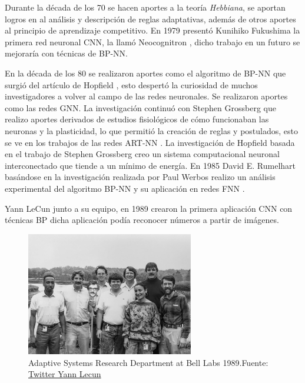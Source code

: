 Durante la década de los 70 se hacen aportes a la teoría \textit{Hebbiana}, se aportan logros en al análisis y descripción de reglas adaptativas, además de otros aportes al principio de aprendizaje competitivo.
En 1979 presentó {Kunihiko Fukushima} la primera red neuronal \gls{CNN}, la llamó Neocognitron \cite{fukushima1979neural}, dicho trabajo en un futuro se mejoraría con técnicas de \gls{BP-NN}.

En la década de los 80 se realizaron aportes como el algoritmo de \gls{BP-NN} que surgió del artículo de {Hopfield} \cite{hopfield1982neural}, esto despertó la curiosidad de muchos investigadores a volver al campo de las redes neuronales.
Se realizaron aportes como las redes \gls{GNN}.
La investigación continuó con {Stephen Grossberg} que realizo aportes derivados de estudios fisiológicos de cómo funcionaban las neuronas y la plasticidad, lo que permitió la creación de reglas y postulados, esto se ve en los trabajos de las redes \acrshort{ART-NN} \cite{grossberg1987competitive}.
La investigación de {Hopfield} basada en el trabajo de {Stephen Grossberg} creo un sistema computacional neuronal interconectado que tiende a un mínimo de energía.
En 1985 {David E. Rumelhart} basándose en la investigación realizada por {Paul Werbos} \cite{etde_5080493} realizo un análisis experimental del algoritmo \gls{BP-NN} y su aplicación en redes \acrshort{FNN} \cite{rumelhart1985learning}.

{Yann LeCun} junto a su equipo, en 1989 crearon la primera aplicación \acrshort{CNN} con técnicas \acrshort{BP} dicha aplicación podía reconocer números a partir de imágenes.

\begin{figure}[H]
    \centering
    \includegraphics[width=0.65\textwidth]{figures/yann-lecun - EyIwmEDW8AIQs1C.jpeg}
    \caption{Adaptive Systems Research Department at Bell Labs 1989.\newline{}Fuente: \href{https://twitter.com/ylecun/status/1378718317695934465}{Twitter Yann Lecun}}
    \label{fig:adaptive-systems-research-department-at-bell-labs}
\end{figure}

